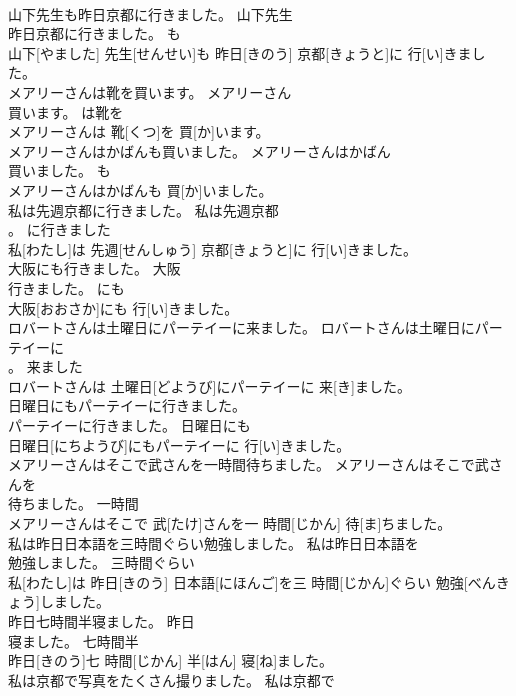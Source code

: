 \documentclass[8pt]{extreport}
\begin{document}
\begin{CJK}{UTF8}{min}
\\	山下先生も昨日京都に行きました。	山下先生
\\	昨日京都に行きました。	も	
\\	山下[やました] 先生[せんせい]も 昨日[きのう] 京都[きょうと]に 行[い]きました。	
\\	メアリーさんは靴を買います。	メアリーさん
\\	買います。	は靴を	
\\	メアリーさんは 靴[くつ]を 買[か]います。	
\\	メアリーさんはかばんも買いました。	メアリーさんはかばん
\\	買いました。	も	
\\	メアリーさんはかばんも 買[か]いました。	
\\	私は先週京都に行きました。	私は先週京都
\\	。	に行きました	
\\	私[わたし]は 先週[せんしゅう] 京都[きょうと]に 行[い]きました。	
\\	大阪にも行きました。	大阪
\\	行きました。	にも	
\\	大阪[おおさか]にも 行[い]きました。	
\\	ロバートさんは土曜日にパーテイーに来ました。	ロバートさんは土曜日にパーテイーに
\\	。	来ました	
\\	ロバートさんは 土曜日[どようび]にパーテイーに 来[き]ました。	
\\	日曜日にもパーテイーに行きました。	
\\	パーテイーに行きました。	日曜日にも	
\\	日曜日[にちようび]にもパーテイーに 行[い]きました。	
\\	メアリーさんはそこで武さんを一時間待ちました。	メアリーさんはそこで武さんを
\\	待ちました。	一時間	
\\	メアリーさんはそこで 武[たけ]さんを一 時間[じかん] 待[ま]ちました。	
\\	私は昨日日本語を三時間ぐらい勉強しました。	私は昨日日本語を
\\	勉強しました。	三時間ぐらい	
\\	私[わたし]は 昨日[きのう] 日本語[にほんご]を三 時間[じかん]ぐらい 勉強[べんきょう]しました。	
\\	昨日七時間半寝ました。	昨日
\\	寝ました。	七時間半	
\\	昨日[きのう]七 時間[じかん] 半[はん] 寝[ね]ました。	
\\	私は京都で写真をたくさん撮りました。	私は京都で

\end{CJK}
\end{document}
